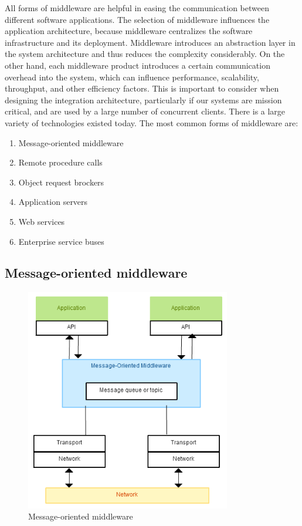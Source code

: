 All forms of middleware are helpful in easing the communication between different software applications. The selection of middleware influences the application architecture, because middleware centralizes the software infrastructure and its deployment. Middleware introduces an abstraction layer in the system architecture and thus reduces the complexity considerably. On the other hand, each middleware product introduces a certain communication overhead into the system, which can influence performance, scalability, throughput, and other efficiency factors. This is important to consider when designing the integration architecture, particularly if our systems are mission critical, and are used by a large number of concurrent clients. There is a large variety of technologies existed today. The most common forms of middleware are:

\begin{enumerate}
\item  Message-oriented middleware

\item  Remote procedure calls

\item  Object request brockers

\item  Application servers

\item  Web services

\item  Enterprise service buses
\end{enumerate}

\subsection{Message-oriented middleware}

\begin{figure}
    \centering
    \includegraphics[width=0.8\textwidth]{resources/MOM.png}
    \caption{Message-oriented middleware}
    \label{fig:mom}
\end{figure}

